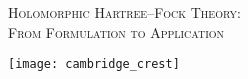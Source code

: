 \begin{titlepage}

\begin{center}
\linespread{1.3}
\textsc{\LARGE Holomorphic Hartree--Fock Theory:\\}
\textsc{\LARGE From Formulation to Application\\} 
\vfill
{}

\vfill 

\texttt{[image: cambridge\_crest]}

\vfill 

\end{center}
\end{titlepage}

